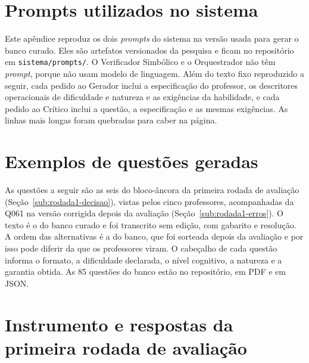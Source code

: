 
\chapter{Prompts utilizados no sistema}
\label{ap:prompts}

Este apêndice reproduz os dois \emph{prompts} do sistema na versão usada para gerar o banco curado.
Eles são artefatos versionados da pesquisa e ficam no repositório em
\texttt{sistema/prompts/}. O Verificador Simbólico e o Orquestrador não têm \emph{prompt}, porque
não usam modelo de linguagem. Além do texto fixo reproduzido a seguir, cada pedido ao Gerador inclui
a especificação do professor, os descritores operacionais de dificuldade e natureza e as exigências
da habilidade, e cada pedido ao Crítico inclui a questão, a especificação e as mesmas exigências.
As linhas mais longas foram quebradas para caber na página.



\chapter{Exemplos de questões geradas}
\label{ap:exemplos}

As questões a seguir são as seis do bloco-âncora da primeira rodada de avaliação
(Seção~\ref{sub:rodada1-decisao}), vistas pelos cinco professores, acompanhadas da Q061 na versão
corrigida depois da avaliação (Seção~\ref{sub:rodada1-erros}). O texto é o do banco curado e foi
transcrito sem edição, com gabarito e resolução. A ordem das alternativas é a do banco, que foi
sorteada depois da avaliação e por isso pode diferir da que os professores viram. O cabeçalho de cada
questão informa o formato, a dificuldade declarada, o nível cognitivo, a natureza e a garantia
obtida. As 85 questões do banco estão no repositório, em PDF e em JSON.



\chapter{Instrumento e respostas da primeira rodada de avaliação}
\label{ap:instrumento}

